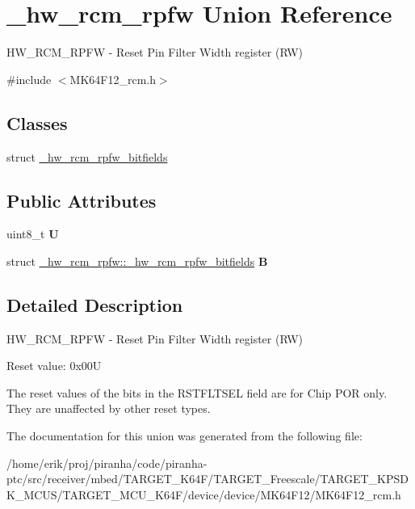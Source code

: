\hypertarget{union__hw__rcm__rpfw}{}\section{\+\_\+hw\+\_\+rcm\+\_\+rpfw Union Reference}
\label{union__hw__rcm__rpfw}


H\+W\+\_\+\+R\+C\+M\+\_\+\+R\+P\+FW -\/ Reset Pin Filter Width register (RW)  




{\ttfamily \#include $<$M\+K64\+F12\+\_\+rcm.\+h$>$}

\subsection*{Classes}
\begin{DoxyCompactItemize}
\item 
struct \hyperlink{struct__hw__rcm__rpfw_1_1__hw__rcm__rpfw__bitfields}{\+\_\+hw\+\_\+rcm\+\_\+rpfw\+\_\+bitfields}
\end{DoxyCompactItemize}
\subsection*{Public Attributes}
\begin{DoxyCompactItemize}
\item 
uint8\+\_\+t {\bfseries U}\hypertarget{union__hw__rcm__rpfw_a3a6ea49c26ff690f2fa968844d46d048}{}\label{union__hw__rcm__rpfw_a3a6ea49c26ff690f2fa968844d46d048}

\item 
struct \hyperlink{struct__hw__rcm__rpfw_1_1__hw__rcm__rpfw__bitfields}{\+\_\+hw\+\_\+rcm\+\_\+rpfw\+::\+\_\+hw\+\_\+rcm\+\_\+rpfw\+\_\+bitfields} {\bfseries B}\hypertarget{union__hw__rcm__rpfw_a69e95866d647b2a083457cac525dea0c}{}\label{union__hw__rcm__rpfw_a69e95866d647b2a083457cac525dea0c}

\end{DoxyCompactItemize}


\subsection{Detailed Description}
H\+W\+\_\+\+R\+C\+M\+\_\+\+R\+P\+FW -\/ Reset Pin Filter Width register (RW) 

Reset value\+: 0x00U

The reset values of the bits in the R\+S\+T\+F\+L\+T\+S\+EL field are for Chip P\+OR only. They are unaffected by other reset types. 

The documentation for this union was generated from the following file\+:\begin{DoxyCompactItemize}
\item 
/home/erik/proj/piranha/code/piranha-\/ptc/src/receiver/mbed/\+T\+A\+R\+G\+E\+T\+\_\+\+K64\+F/\+T\+A\+R\+G\+E\+T\+\_\+\+Freescale/\+T\+A\+R\+G\+E\+T\+\_\+\+K\+P\+S\+D\+K\+\_\+\+M\+C\+U\+S/\+T\+A\+R\+G\+E\+T\+\_\+\+M\+C\+U\+\_\+\+K64\+F/device/device/\+M\+K64\+F12/M\+K64\+F12\+\_\+rcm.\+h\end{DoxyCompactItemize}
